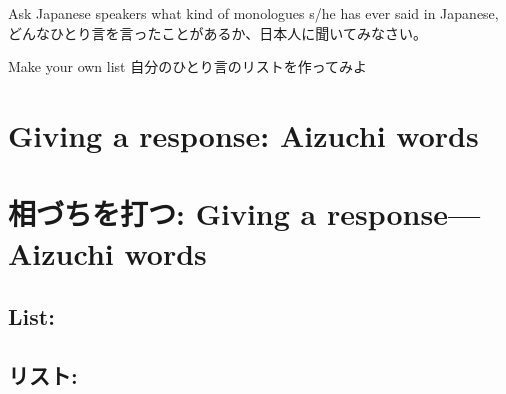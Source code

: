 \documentclass[uplatex,dvipdfmx,b5paper,english,10pt]{jsbook}
\begin{document}
\begin{toiquestion}
\ifEnglish
Ask Japanese speakers what kind of monologues s/he has ever said in Japanese,
\else
どんなひとり言を言ったことがあるか、日本人に聞いてみなさい。
\fi
\end{toiquestion}

\begin{toiquestion}
\ifEnglish
Make your own list
\else
自分のひとり言のリストを作ってみよ
\fi
\end{toiquestion}

%
%

\ifEnglish
\section{Giving a response: Aizuchi words}
\else
\section{相づちを打つ: Giving a response---Aizuchi words}
\fi


\ifEnglish
\subsection{List: }
\else
\subsection{リスト: }
\fi
\end{document}
